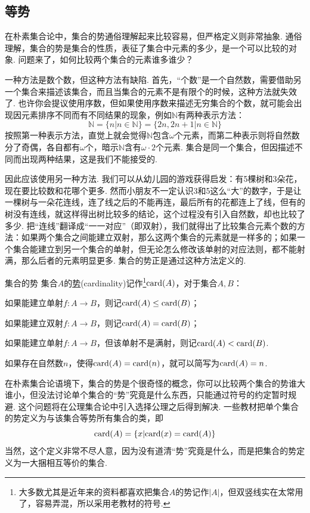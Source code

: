 \subsection{等势}

在朴素集合论中，集合的势通俗理解起来比较容易，但严格定义则非常抽象. 通俗理解，集合的势是集合的性质，表征了集合中元素的多少，是一个可以比较的对象. 问题来了，如何比较两个集合的元素谁多谁少？

一种方法是数个数，但这种方法有缺陷. 首先，“个数”是一个自然数，需要借助另一个集合来描述该集合，而且当集合的元素不是有限个的时候，这种方法就失效了. 也许你会提议使用序数，但如果使用序数来描述无穷集合的个数，就可能会出现因元素排序不同而有不同结果的现象，例如\(\mathbb{N}\)有两种表示方法：
\[\mathbb{N} = \{n | n \in \mathbb{N}\} = \{2n,2n+1 | n \in \mathbb{N}\}\]
按照第一种表示方法，直觉上就会觉得\(\mathbb{N}\)包含\(\omega\)个元素，而第二种表示则将自然数分了奇偶，各自都有\(\omega\)个，暗示\(\mathbb{N}\)含有\(\omega\cdot2\)个元素. 集合是同一个集合，但因描述不同而出现两种结果，这是我们不能接受的.

因此应该使用另一种方法. 我们可以从幼儿园的游戏获得启发：有5棵树和3朵花，现在要比较数和花哪个更多. 然而小朋友不一定认识3和5这么“大”的数字，于是让一棵树与一朵花连线，连了线之后的不能再连，最后所有的花都连上了线，但有的树没有连线，就这样得出树比较多的结论，这个过程没有引入自然数，却也比较了多少. 把“连线”翻译成“一一对应”（即双射），我们就得出了比较集合元素个数的方法：如果两个集合之间能建立双射，那么这两个集合的元素就是一样多的；如果一个集合能建立到另一个集合的单射，但无论怎么修改该单射的对应法则，都不能射满，那么后者的元素明显更多. 集合的势正是通过这种方法定义的.

\begin{definition}{集合的势}
    集合\(A\)的\underline{势}(cardinality)记作\footnote{大多数尤其是近年来的资料都喜欢把集合\(A\)的势记作\(|A|\)，但双竖线实在太常用了，容易弄混，所以采用老教材的符号.}\({\rm card}(A)\)，对于集合\(A,B\)：
    \par
    如果能建立单射\(f:A \to B\)，则记\({\rm card}(A) \leq {\rm card}(B)\)；
    \par
    如果能建立双射\(f:A \to B\)，则记\({\rm card}(A) = {\rm card}(B)\)；
    \par
    如果能建立单射\(f:A \to B\)，但该单射不是满射，则记\({\rm card}(A) <{\rm card}(B)\).
    \par
    如果存在自然数\(n\)，使得\({\rm card}(A) = {\rm card}(n)\)，就可以简写为\({\rm card}(A) = n\).
\end{definition}

在朴素集合论语境下，集合的势是个很奇怪的概念，你可以比较两个集合的势谁大谁小，但没法讨论单个集合的“势”究竟是什么东西，只能通过符号的约定暂时规避. 这个问题将在公理集合论中引入选择公理之后得到解决. 一些教材把单个集合的势定义为与该集合等势所有集合的类，即
\[{\rm card}(A) = \{x|{\rm card}(x)={\rm card}(A)\}\]
当然，这个定义非常不尽人意，因为没有道清“势”究竟是什么，而是把集合的势定义为一大捆相互等价的集合.

